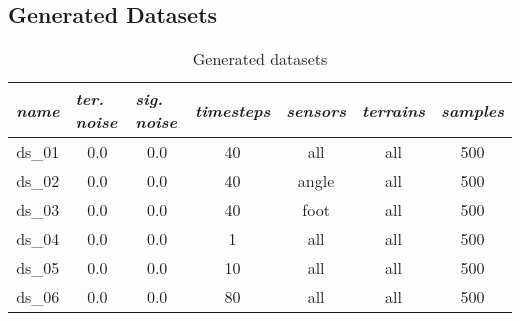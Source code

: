 \subsection{Generated Datasets} \label{ssec:generated_datasets}

\begin{table}[H]
\centering
\caption{Generated datasets}
\label{tab:generated_datasets}
\begin{tabular}{|c|c|c|c|c|c|c|}
\hline
\multicolumn{1}{|l|}{\textit{name}} & \multicolumn{1}{l|}{\textit{ter. noise}} & \multicolumn{1}{l|}{\textit{sig. noise}} & \multicolumn{1}{l|}{\textit{timesteps}} & \multicolumn{1}{l|}{\textit{sensors}} & \multicolumn{1}{l|}{\textit{terrains}} & \multicolumn{1}{l|}{\textit{samples}} \\ \hline
ds\_01                              & 0.0                                             & 0.0                                            & 40                                      & all                                   & all                                    & 500                                     \\ \hline
ds\_02                              & 0.0                                             & 0.0                                            & 40                                      & angle                                 & all                                    & 500                                     \\ \hline
ds\_03                              & 0.0                                             & 0.0                                            & 40                                      & foot                                  & all                                    & 500                                     \\ \hline
ds\_04                              & 0.0                                             & 0.0                                            & 1                                       & all                                   & all                                    & 500                                     \\ \hline
ds\_05                              & 0.0                                             & 0.0                                            & 10                                      & all                                   & all                                    & 500                                     \\ \hline
ds\_06                              & 0.0                                             & 0.0                                            & 80                                      & all                                   & all                                    & 500                                     \\ \hline

\end{tabular}
\end{table}
